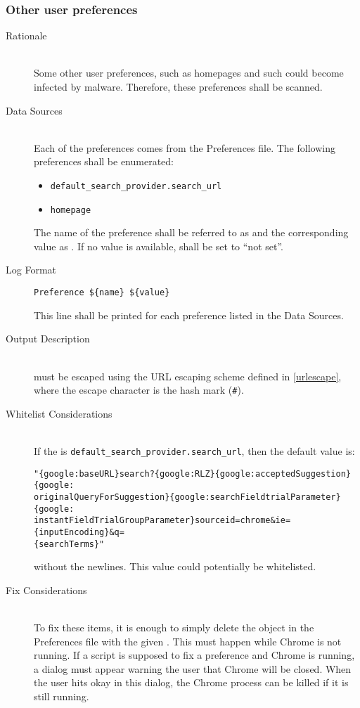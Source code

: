 \subsubsection{Other user preferences} \label{sec:chrome_user_preferences}
\begin{description}
\item[Rationale] \hfill \\
Some other user preferences, such as homepages and such could become infected by
malware.  Therefore, these preferences shall be scanned.
\item[Data Sources] \hfill \\
Each of the preferences comes from the Preferences file.  The following
preferences shall be enumerated:
\begin{itemize}
  \item \verb|default_search_provider.search_url|
  \item \verb|homepage|  
\end{itemize}
The name of the preference shall be referred to as  and the
corresponding value as .  If no value is available, 
shall be set to ``not set''.
\item[Log Format] \hfill 
\vspace{-\baselineskip}
\begin{verbatim}
Preference ${name} ${value}
\end{verbatim}
This line shall be printed for each preference listed in the Data Sources.
\item[Output Description] \hfill \\
 must be escaped using the URL escaping scheme defined in
\ref{urlescape}, where the escape character is the hash mark (\verb|#|).
\item[Whitelist Considerations] \hfill \\
If the  is \verb|default_search_provider.search_url|, then the default
value is:
\vspace{-\baselineskip}
\begin{verbatim}
"{google:baseURL}search?{google:RLZ}{google:acceptedSuggestion}{google:
originalQueryForSuggestion}{google:searchFieldtrialParameter}{google:
instantFieldTrialGroupParameter}sourceid=chrome&ie={inputEncoding}&q=
{searchTerms}"
\end{verbatim}
without the newlines.  This value could potentially be whitelisted.  
\item[Fix Considerations] \hfill \\
To fix these items, it is enough to simply delete the object in the Preferences
file with the given .  This must happen while Chrome is not running. 
If a script is supposed to fix a preference and Chrome is running, a dialog must
appear warning the user that Chrome will be closed.  When the user hits okay in
this dialog, the Chrome process can be killed if it is still running.
\end{description}

